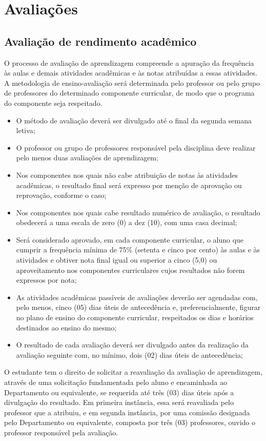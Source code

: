 \chapter{Avaliações}
\DoPToC
\section{Avaliação de rendimento acadêmico}

O processo de avaliação de aprendizagem compreende a apuração da frequência às aulas e demais atividades acadêmicas e às notas atribuídas a essas atividades. A metodologia de ensino-avaliação será determinada pelo professor ou pelo grupo de professores do determinado componente curricular, de modo que o programa do componente seja respeitado.

\begin{itemize}
        \item O método de avaliação deverá ser divulgado até o final da segunda semana letiva;
        \item O professor ou grupo de professores responsável pela disciplina deve realizar pelo menos duas avaliações de aprendizagem;
        \item Nos componentes nos quais não cabe atribuição de notas às atividades acadêmicas, o resultado final será expresso por menção de aprovação ou reprovação, conforme o caso;
        \item Nos componentes nos quais cabe resultado numérico de avaliação, o resultado obedecerá a uma escala de zero (0) a dez (10), com uma casa decimal;
        \item Será considerado aprovado, em cada componente curricular, o aluno que cumprir a frequência mínima de 75\% (setenta e cinco por cento) às aulas e às atividades e obtiver nota final igual ou superior a cinco (5,0) ou aproveitamento nos componentes curriculares cujos resultados não forem expressos por nota;
        \item As atividades acadêmicas passíveis de avaliações deverão ser agendadas com, pelo menos, cinco (05) dias úteis de antecedência e, preferencialmente, figurar no plano de ensino do componente curricular, respeitados os dias e horários destinados ao ensino do mesmo;
        \item O resultado de cada avaliação deverá ser divulgado antes da realização da avaliação seguinte com, no mínimo, dois (02) dias úteis de antecedência;
\end{itemize}

O estudante tem o direito de solicitar a reavaliação da avaliação de aprendizagem, através de uma solicitação fundamentada pelo aluno e encaminhada ao Departamento ou equivalente, se requerida até três (03) dias úteis após a divulgação do resultado. Em primeira instância, essa será reavaliada pelo professor que a atribuiu, e em segunda instância, por uma comissão designada pelo Departamento ou equivalente, composta por três (03) professores, ouvido o professor responsável pela avaliação.

